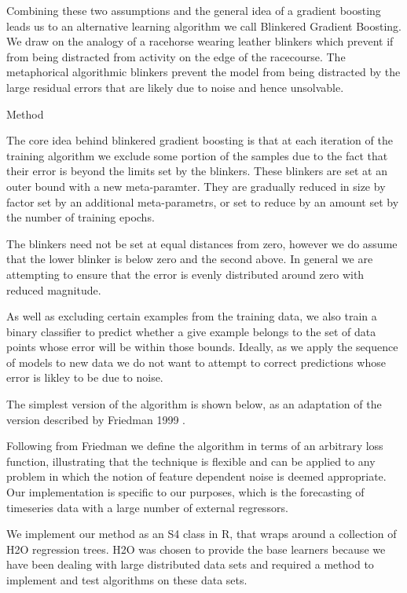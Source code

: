 Combining these two assumptions and the general idea of a gradient boosting leads us to
an alternative learning algorithm we call Blinkered Gradient Boosting. 
We draw on the analogy of a racehorse wearing 
leather blinkers which prevent if from being distracted from activity on the edge
of the racecourse. The metaphorical algorithmic blinkers prevent the model from being
distracted by the large residual errors that are likely due to noise and hence unsolvable.
 

Method

The core idea behind blinkered gradient boosting is that at each iteration of the training
algorithm we exclude some portion of the samples due to the fact that their error is beyond
the limits set by the blinkers. These blinkers are set at an outer bound with a new meta-paramter.
They are gradually reduced in size by factor set by an additional meta-parametrs, or set to 
reduce by an amount set by the number of training epochs.

The blinkers need not be set at equal distances from zero, however we do assume that the lower blinker
is below zero and the second above. In general we are attempting to ensure that the error is evenly
distributed around zero with reduced magnitude.

As well as excluding certain examples from the training data, we also train a binary classifier
to predict whether a give example belongs to the set of data points whose error will be within those
bounds. Ideally, as we apply the sequence of models to new data we do not want to attempt to correct
predictions whose error is likley to be due to noise.

The simplest version of the algorithm is shown below, as an adaptation of the version described by
Friedman 1999 \cite{firedman_1999}.


 
Following from Friedman we define the algorithm in terms of an arbitrary loss function, illustrating
that the technique is flexible and can be applied to any problem in which the notion of feature dependent
noise is deemed appropriate. Our implementation is specific to our purposes, which is the forecasting
of timeseries data with a large number of external regressors.

We implement our method as an S4 class in R, that wraps around a collection of H2O regression trees.
H2O was chosen to provide the base learners because we have been dealing with large distributed data 
sets and required a method to implement and test algorithms on these data sets.

